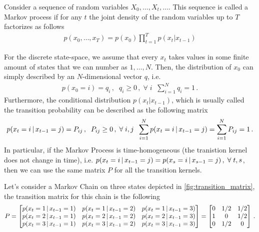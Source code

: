\begin{mybox}
\begin{definition}
Consider a sequence of random variables $X_0,\ldots,X_t,\ldots$. This sequence is called a Markov process if for any $t$ the joint density of the random variables up to $T$ factorizes as follows
\begin{align}
    p(x_0,\ldots, x_T) = p(x_0)\prod_{t=1}^T p(x_{t}|x_{t-1})
\end{align}
\end{definition}
\end{mybox}

For the discrete state-space, we assume that every $x_t$ takes values in some finite amount of states that we can number as $1,\ldots,N$.
Then, the distribution of $x_0$ can simply described by an $N$-dimensional vector $q$, i.e.
\begin{align}
    p(x_0=i) = q_i\,, \;\; q_i \geq 0\,, \;\forall \;i\;\; \sum_{i=1}^N q_i = 1\,.
\end{align}
Furthermore, the conditional distribution $p(x_{t}|x_{t-1})$, which is usually called the transition probability can be described as the following matrix
\begin{align}
    p(x_t=i\,|\, x_{t-1}=j) = P_{ij}\,, \;\; P_{ij} \geq 0\,, \;\forall \;i,j\;\; \sum_{i=1}^N p(x_t=i\,|\, x_{t-1}=j) = \sum_{i=1}^N P_{ij} = 1\,.
\end{align}
In particular, if the Markov Process is time-homogeneous (the tranistion kernel does not change in time), i.e. $p(x_t=i\,|\, x_{t-1}=j) = p(x_s=i\,|\, x_{s-1}=j)\,, \;\forall \;t,s$, then we can use the same matrix $P$ for all the transition kernels.

\begin{example}
\label{ex:transition_matrix}
    Let's consider a Markov Chain on three states depicted in \cref{fig:transition_matrix}, the transition matrix for this chain is the following
    \begin{align}
        P = 
        \begin{bmatrix}
        p(x_t=1\,|\, x_{t-1}=1) & p(x_t=1\,|\, x_{t-1}=2) & p(x_t=1\,|\, x_{t-1}=3)\\
        p(x_t=2\,|\, x_{t-1}=1) & p(x_t=2\,|\, x_{t-1}=2) & p(x_t=2\,|\, x_{t-1}=3)\\
        p(x_t=3\,|\, x_{t-1}=1) & p(x_t=3\,|\, x_{t-1}=2) & p(x_t=3\,|\, x_{t-1}=3)
        \end{bmatrix}
        =
        \begin{bmatrix}
        0 & 1/2 & 1/2\\
        1 & 0 & 1/2\\
        0 & 1/2 & 0
        \end{bmatrix}\,.
    \end{align}
\end{example}

